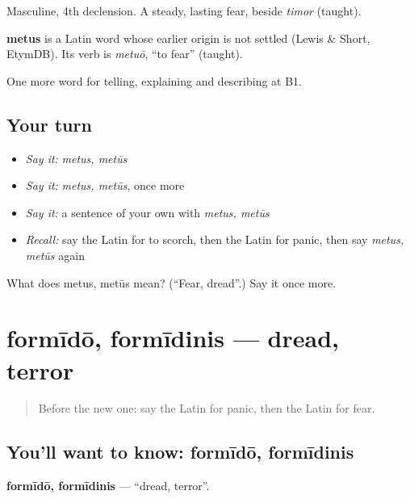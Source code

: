 Masculine, 4th declension. A steady, lasting fear, beside \emph{timor} (taught).

\begin{cousinweb}
\textbf{metus} is a Latin word whose earlier origin is not settled (Lewis \& Short, EtymDB). Its verb is \emph{metuō}, \textquotedblleft{}to fear\textquotedblright{} (taught).
\end{cousinweb}

\begin{grammarlens}[title={What you've built}]
One more word for telling, explaining and describing at B1.
\end{grammarlens}

\subsection*{Your turn}
\begin{itemize}
\raggedright
  \item \emph{Say it:} \emph{metus, metūs}
  \item \emph{Say it:} \emph{metus, metūs}, once more
  \item \emph{Say it:} a sentence of your own with \emph{metus, metūs}
  \item \emph{Recall:} say the Latin for to scorch, then the Latin for panic, then say \emph{metus, metūs} again
\end{itemize}

\begin{tcolorbox}[breakable,colback=teal!4,colframe=teal!35!black,title={Before you move on}]
What does metus, metūs mean? (\textquotedblleft{}Fear, dread\textquotedblright{}.) Say it once more.
\end{tcolorbox}
\section[formīdō, formīdinis]{formīdō, formīdinis — dread, terror}

\label{lesson:LA-C320-formido}



\begin{quote}
Before the new one: say the Latin for panic, then the Latin for fear.
\end{quote}

\subsection*{You'll want to know: formīdō, formīdinis}
\textbf{formīdō, formīdinis} — \textquotedblleft{}dread, terror\textquotedblright{}.

